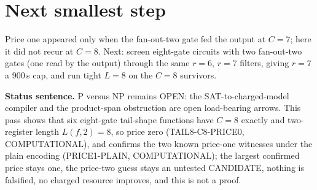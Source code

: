 \documentclass[11pt]{article}
\begin{document}
\section*{Next smallest step}
Price one appeared only when the fan-out-two gate fed the output at $C=7$; here it did not recur at $C=8$. Next: screen eight-gate circuits with two fan-out-two gates (one read by the output) through the same $r=6$, $r=7$ filters, giving $r=7$ a 900\,s cap, and run tight $L=8$ on the $C=8$ survivors.

\bigskip
\noindent\textbf{Status sentence.} P versus NP remains OPEN: the SAT-to-charged-model compiler and the product-span obstruction are open load-bearing arrows. This pass shows that six eight-gate tail-shape functions have $C=8$ exactly and two-register length $L(f,2)=8$, so price zero (TAIL8-C8-PRICE0, COMPUTATIONAL), and confirms the two known price-one witnesses under the plain encoding (PRICE1-PLAIN, COMPUTATIONAL); the largest confirmed price stays one, the price-two guess stays an untested CANDIDATE, nothing is falsified, no charged resource improves, and this is not a proof.
\end{document}
